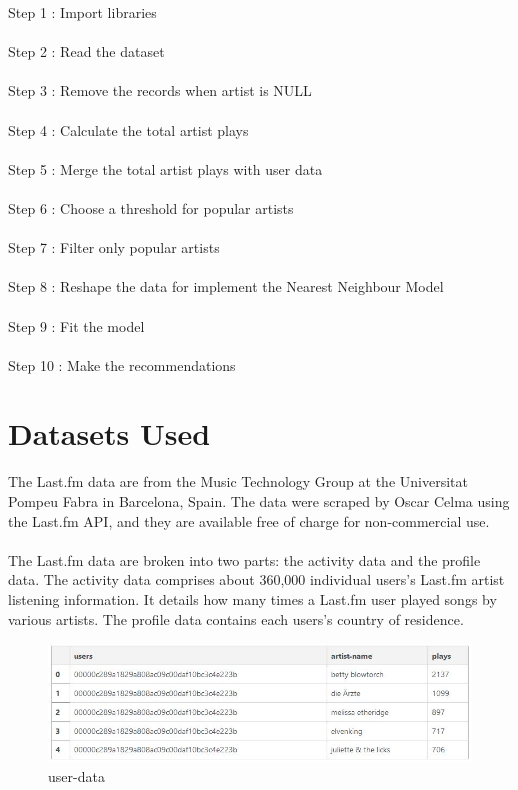 \documentclass[paper=a4, fontsize=12pt]{scrartcl}
\numberwithin{equation}{section}		%
\numberwithin{figure}{section}			%
\numberwithin{table}{section}				%
\begin{document}
Step 1 : Import libraries
\\
\\
Step 2 : Read the dataset
\\
\\
Step 3 : Remove the records when artist is NULL
\\
\\
Step 4 : Calculate the total artist plays
\\
\\
Step 5 : Merge the total artist plays with user data
\\
\\
Step 6 : Choose a threshold for popular artists
\\
\\
Step 7 : Filter only popular artists
\\
\\
Step 8 : Reshape the data for implement the Nearest Neighbour Model 
\\
\\
Step 9 : Fit the model
\\
\\
Step 10 : Make the recommendations

\section{Datasets Used}

The Last.fm data are from the Music Technology Group at the Universitat Pompeu Fabra in Barcelona, Spain. The data were scraped by Oscar Celma using the Last.fm API, and they are available free of charge for non-commercial use.
\\
\\	
The Last.fm data are broken into two parts: the activity data and the profile data. The activity data comprises about 360,000 individual users's Last.fm artist listening information. It details how many times a Last.fm user played songs by various artists. The profile data contains each users's country of residence.

\begin{figure}[!b]
  \vspace{1cm}  
  \centering  
  \includegraphics[scale=0.7]{user_data.jpg}
  \caption{user-data}
  \label{fig:boat1}
\end{figure}
\end{document}
